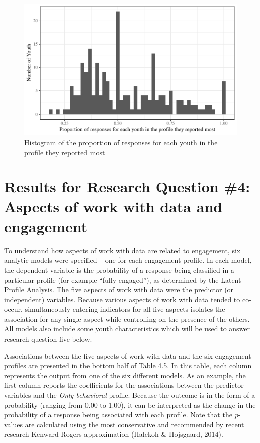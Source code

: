 \documentclass[]{msu-thesis}
\theoremstyle{definition}
\theoremstyle{definition}
\theoremstyle{definition}
\theoremstyle{remark}
\begin{document}
\begin{figure}

{\centering \includegraphics[width=0.8\linewidth]{rosenberg-dissertation_files/figure-latex/unnamed-chunk-14-1} 

}

\caption{Histogram of the proportion of responses for each youth in the profile they reported most}\label{fig:unnamed-chunk-14}
\end{figure}

\section{Results for Research Question \#4: Aspects of work with data
and
engagement}\label{results-for-research-question-4-aspects-of-work-with-data-and-engagement}

To understand how aspects of work with data are related to engagement,
six analytic models were specified -- one for each engagement profile.
In each model, the dependent variable is the probability of a response
being classified in a particular profile (for example ``fully
engaged''), as determined by the Latent Profile Analysis. The five
aspects of work with data were the predictor (or independent) variables.
Because various aspects of work with data tended to co-occur,
simultaneously entering indicators for all five aspects isolates the
association for any single aspect while controlling on the presence of
the others. All models also include some youth characteristics which
will be used to answer research question five below.

Associations between the five aspects of work with data and the six
engagement profiles are presented in the bottom half of Table 4.5. In
this table, each column represents the output from one of the six
different models. As an example, the first column reports the
coefficients for the associations between the predictor variables and
the \emph{Only behavioral} profile. Because the outcome is in the form
of a probability (ranging from 0.00 to 1.00), it can be interpreted as
the change in the probability of a response being associated with each
profile. Note that the \emph{p}-values are calculated using the most
conservative and recommended by recent research Kenward-Rogers
approximation (Halekoh \& Hojsgaard, 2014).
\end{document}
